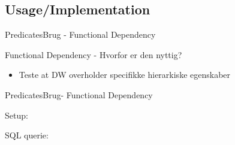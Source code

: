 
\subsection{Usage/Implementation}
\begin{frame}{Predicates}{Brug - Functional Dependency}
	\begin{block}{Functional Dependency - Hvorfor er den nyttig?}
		\begin{itemize}
			\item<1-> Teste at DW overholder specifikke hierarkiske egenskaber
		\end{itemize}
	\end{block}
\end{frame}

\begin{frame}{Predicates}{Brug- Functional Dependency}
	\begin{block}{Setup:}
	\end{block}
	\begin{block}{SQL querie:}
	\end{block}
\end{frame}

